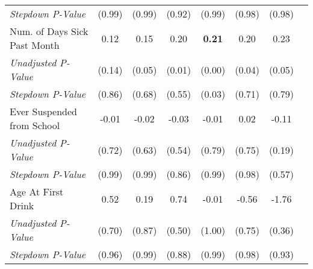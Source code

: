 \begin{tabular}{l c c c c c c c}
\quad \textit{Stepdown P-Value} & (0.99) & (0.99) & (0.92) & (0.99) & (0.98) & (0.98) \\
Num. of Days Sick Past Month & 0.12 & 0.15 & 0.20 & \textbf{ 0.21 } & 0.20 & 0.23 \\
\quad \textit{Unadjusted P-Value} & (0.14) & (0.05) & (0.01) & (0.00) & (0.04) & (0.05) \\
\quad \textit{Stepdown P-Value} & (0.86) & (0.68) & (0.55) & (0.03) & (0.71) & (0.79) \\
Ever Suspended from School & -0.01 & -0.02 & -0.03 & -0.01 & 0.02 & -0.11 \\
\quad \textit{Unadjusted P-Value} & (0.72) & (0.63) & (0.54) & (0.79) & (0.75) & (0.19) \\
\quad \textit{Stepdown P-Value} & (0.99) & (0.99) & (0.86) & (0.99) & (0.98) & (0.57) \\
Age At First Drink & 0.52 & 0.19 & 0.74 & -0.01 & -0.56 & -1.76 \\
\quad \textit{Unadjusted P-Value} & (0.70) & (0.87) & (0.50) & (1.00) & (0.75) & (0.36) \\
\quad \textit{Stepdown P-Value} & (0.96) & (0.99) & (0.88) & (0.99) & (0.98) & (0.93) \\
\bottomrule
\end{tabular}
